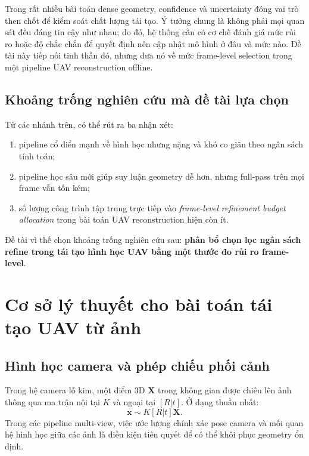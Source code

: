 \documentclass[12pt,a4paper,oneside]{report}
\begin{document}
Trong rất nhiều bài toán dense geometry, confidence và uncertainty đóng vai trò then chốt để kiểm soát chất lượng tái tạo. Ý tưởng chung là không phải mọi quan sát đều đáng tin cậy như nhau; do đó, hệ thống cần có cơ chế đánh giá mức rủi ro hoặc độ chắc chắn để quyết định nên cập nhật mô hình ở đâu và mức nào. Đề tài này tiếp nối tinh thần đó, nhưng đưa nó về mức frame-level selection trong một pipeline UAV reconstruction offline.

\section{Khoảng trống nghiên cứu mà đề tài lựa chọn}

Từ các nhánh trên, có thể rút ra ba nhận xét:
\begin{enumerate}[leftmargin=1.5em]
  \item pipeline cổ điển mạnh về hình học nhưng nặng và khó co giãn theo ngân sách tính toán;
  \item pipeline học sâu mới giúp suy luận geometry dễ hơn, nhưng full-pass trên mọi frame vẫn tốn kém;
  \item số lượng công trình tập trung trực tiếp vào \textit{frame-level refinement budget allocation} trong bài toán UAV reconstruction hiện còn ít.
\end{enumerate}

Đề tài vì thế chọn khoảng trống nghiên cứu sau: \textbf{phân bổ chọn lọc ngân sách refine trong tái tạo hình học UAV bằng một thước đo rủi ro frame-level}.

\chapter{Cơ sở lý thuyết cho bài toán tái tạo UAV từ ảnh}

\section{Hình học camera và phép chiếu phối cảnh}

Trong hệ camera lỗ kim, một điểm 3D $\mathbf{X}$ trong không gian được chiếu lên ảnh thông qua ma trận nội tại $K$ và ngoại tại $[R|t]$. Ở dạng thuần nhất:
\[
\mathbf{x} \sim K [R|t] \mathbf{X}.
\]
Trong các pipeline multi-view, việc ước lượng chính xác pose camera và mối quan hệ hình học giữa các ảnh là điều kiện tiên quyết để có thể khôi phục geometry ổn định.
\end{document}
